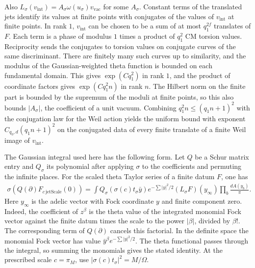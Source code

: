 Also \(L_\sigma(v_\mathrm{int})=A_\sigma\omega(u_\sigma)v_\mathrm{vac}\)
for some \(A_\sigma\). Constant terms of the translated jets identify
its values at finite points with conjugates of the values of
\(v_\mathrm{int}\) at finite points. In rank \(1\), \(v_\mathrm{int}\) can be
chosen to be a sum of at most \(q_1^{2f}\) translates of \(F\).
Each term is a phase of modulus \(1\) times a product of \(q_1^2\)
CM torsion values. Reciprocity sends the conjugates to torsion values
on conjugate curves of the same discriminant. There are finitely many
such curves up to similarity, and the modulus of the Gaussian-weighted
theta function is bounded on each fundamental domain. This gives
\(\exp(Cq_1^2)\) in rank \(1\), and the product of coordinate factors
gives \(\exp(Cq_1^2n)\) in rank \(n\). The Hilbert norm on the finite
part is bounded by the supremum of the moduli at finite points, so this
also bounds \(|A_\sigma|\), the coefficient of a unit vacuum.
Combining \(q_1^2n\le(q_1n+1)^2\) with the conjugation law for the
Weil action yields the uniform bound with exponent
\(C_{q_0,d}(q_1n+1)^2\) on the conjugated data of every finite translate
of a finite Weil image of \(v_\mathrm{int}\).

The Gaussian integral used here has the following form.
Let \(Q\) be a Schur matrix entry and \(Q_\sigma\) its polynomial
after applying \(\sigma\) to the coefficients and permuting the
infinite places. For the scaled theta Taylor series of a finite
datum \(F\), one has
\begin{align*}
 \sigma\!\left(Q(\partial)F_{c\,\mathrm{jetScale}}(0)\right)
  =\int Q_\sigma\!\left(\sigma(c)t_\sigma\bar y\right)
       e^{-\sum|y|^2/2}(L_\sigma F)(y_\infty)
       \prod_b \frac{dA(y_b)}{\pi}.
\end{align*}
Here \(y_\infty\) is the adelic vector with Fock coordinate \(y\)
and finite component zero.
Indeed, the coefficient of \(z^\beta\) is the theta value of
the integrated monomial Fock vector against the finite datum
times the scale to the power \(|\beta|\), divided by \(\beta!\).
The corresponding term of \(Q(\partial)\) cancels this factorial.
In the definite space the monomial Fock vector has value
\(\bar y^\beta e^{-\sum |y|^2/2}\).
The theta functional passes through the integral, so summing the
monomials gives the stated identity. At the prescribed scale
\(c=\pi_M\), use \(|\sigma(c)t_\sigma|^2=M/\Omega\).

